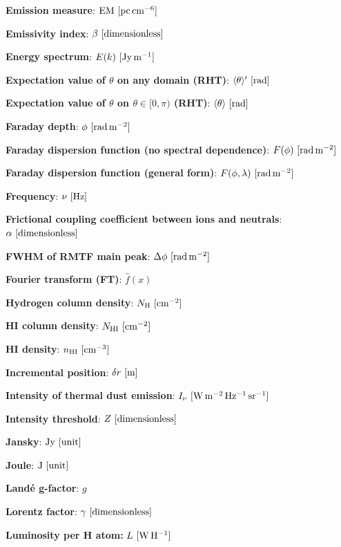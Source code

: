 \documentclass[a4paper,10pt]{article}
\begin{document}
{\noindent}\textbf{Emission measure}: ${\rm EM} ~ [{\rm pc\,cm^{-6}}]$

{\noindent}\textbf{Emissivity index}: $\beta ~ [{\rm dimensionless}]$

{\noindent}\textbf{Energy spectrum}: $E(k)~[{\rm Jy\,m^{-1}}]$

{\noindent}\textbf{Expectation value of $\theta$ on any domain (RHT)}: $\langle\theta\rangle' ~ [{\rm rad}]$

{\noindent}\textbf{Expectation value of $\theta$ on $\theta\in[0,\pi)$ (RHT)}: $\langle\theta\rangle ~ [{\rm rad}]$

{\noindent}\textbf{Faraday depth}: $\phi~[{\rm rad\,m^{-2}}]$

{\noindent}\textbf{Faraday dispersion function (no spectral dependence)}: $F(\phi)~[{\rm rad\,m^{-2}}]$

{\noindent}\textbf{Faraday dispersion function (general form)}: $F(\phi,\lambda)~[{\rm rad\,m^{-2}}]$

{\noindent}\textbf{Frequency}: $\nu~[{\rm Hz}]$

{\noindent}\textbf{Frictional coupling coefficient between ions and neutrals}: $\alpha~[{\rm dimensionless}]$

{\noindent}\textbf{FWHM of RMTF main peak}: $\Delta\phi~[{\rm rad\,m^{-2}}]$

{\noindent}\textbf{Fourier transform (FT)}: $\hat{f}(x)$

{\noindent}\textbf{Hydrogen column density}: $N_{\rm H} ~ [{\rm cm^{-2}}]$

{\noindent}\textbf{HI column density}: $N_{\rm HI} ~ [{\rm cm^{-2}}]$

{\noindent}\textbf{HI density}: $n_{\rm HI}~[{\rm cm^{-3}}]$

{\noindent}\textbf{Incremental position}: $\delta r~[{\rm m}]$

{\noindent}\textbf{Intensity of thermal dust emission}: $I_\nu~ [{\rm W\,m^{-2}\,Hz^{-1}\,sr^{-1}}]$

{\noindent}\textbf{Intensity threshold}: $Z ~ [{\rm dimensionless}]$

{\noindent}\textbf{Jansky}: $\mathrm{Jy} ~ [\rm unit]$

{\noindent}\textbf{Joule}: $\mathrm{J} ~ [\rm unit]$

{\noindent}\textbf{Land\'e g-factor}: $g$

{\noindent}\textbf{Lorentz factor}: $\gamma ~ [\rm dimensionless]$

{\noindent}\textbf{Luminosity per H atom:} $L ~ [{\rm W\,H^{-1}}]$
\end{document}
